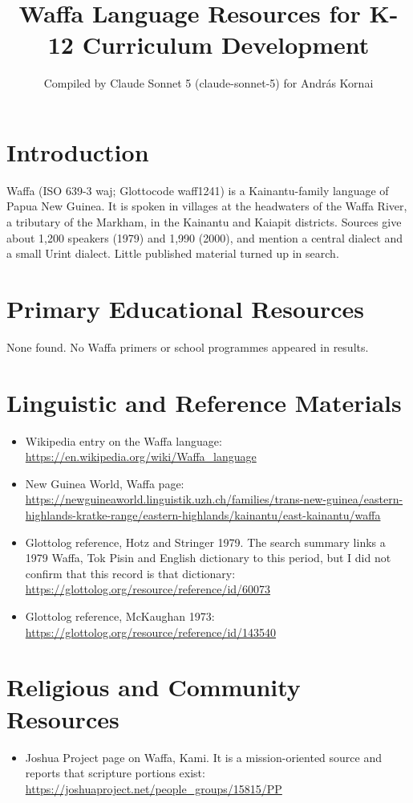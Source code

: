 \documentclass[12pt]{article}
\title{Waffa Language Resources for K-12 Curriculum Development}
\author{Compiled by Claude Sonnet 5 (claude-sonnet-5) for Andr\'as Kornai}
\date{}
\begin{document}
\maketitle

\section{Introduction}
Waffa (ISO 639-3 waj; Glottocode waff1241) is a Kainantu-family language of Papua New Guinea. It is spoken in villages at the headwaters of the Waffa River, a tributary of the Markham, in the Kainantu and Kaiapit districts. Sources give about 1,200 speakers (1979) and 1,990 (2000), and mention a central dialect and a small Urint dialect. Little published material turned up in search.

\section{Primary Educational Resources}
None found. No Waffa primers or school programmes appeared in results.

\section{Linguistic and Reference Materials}
\begin{itemize}
\item Wikipedia entry on the Waffa language: \url{https://en.wikipedia.org/wiki/Waffa_language}
\item New Guinea World, Waffa page: \url{https://newguineaworld.linguistik.uzh.ch/families/trans-new-guinea/eastern-highlands-kratke-range/eastern-highlands/kainantu/east-kainantu/waffa}
\item Glottolog reference, Hotz and Stringer 1979. The search summary links a 1979 Waffa, Tok Pisin and English dictionary to this period, but I did not confirm that this record is that dictionary: \url{https://glottolog.org/resource/reference/id/60073}
\item Glottolog reference, McKaughan 1973: \url{https://glottolog.org/resource/reference/id/143540}
\end{itemize}

\section{Religious and Community Resources}
\begin{itemize}
\item Joshua Project page on Waffa, Kami. It is a mission-oriented source and reports that scripture portions exist: \url{https://joshuaproject.net/people_groups/15815/PP}
\end{itemize}
\end{document}
